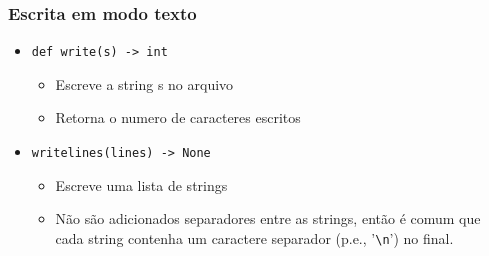 \documentclass[12pt]{article}
\begin{document}
            \subsubsection{Escrita em modo texto}
            \begin{itemize}
                \item \verb|def write(s) -> int|
                \begin{itemize}
                    \item Escreve a string s no arquivo
                    \item Retorna o numero de caracteres escritos
                \end{itemize}
                \item \verb|writelines(lines) -> None|
                \begin{itemize}
                    \item Escreve uma lista de strings
                    \item Não são adicionados separadores entre as strings, 
                    então é comum que cada string contenha um caractere 
                    separador (p.e., '\verb|\n|') no final.
                \end{itemize}
            \end{itemize}
\end{document}
